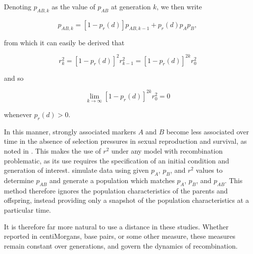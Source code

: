 \documentclass{article}
\begin{document}
Denoting $p_{AB,k}$ as the value of $p_{AB}$ at generation $k$, we then write

$$p_{AB,k} = [1 - p_r(d)] p_{AB,k-1} + p_r(d) p_A p_B,$$

\noindent from which it can easily be derived that

$$r^2_k = \left [ 1 - p_r(d) \right ]^2 r^2_{k-1} =  \left [ 1 - p_r(d) \right ]^{2k} r^2_0$$

\noindent and so

$$\lim_{k \rightarrow \infty} \left [ 1 - p_r(d) \right ]^{2k} r^2_0 = 0$$

\noindent whenever $p_r(d) > 0$.

In this manner, strongly associated markers $A$ and $B$ become less associated over time in the absence of selection pressures in sexual reproduction and survival, as noted in \cite{siegmundyakir2007}. This makes the use of $r^2$ under any model with recombination problematic, as its use requires the specification of an initial condition and generation of interest. \cite{LiJi2005} simulate data using given $p_A$, $p_B$, and $r^2$ values to determine $p_{AB}$ and generate a population which matches $p_A$, $p_B$, and $p_{AB}$. This method therefore ignores the population characteristics of the parents and offspring, instead providing only a snapshot of the population characteristics at a particular time.

It is therefore far more natural to use a distance in these studies. Whether reported in centiMorgans, base pairs, or some other measure, these measures remain constant over generations, and govern the dynamics of recombination.


\renewcommand*{\bibname}{References} %

\end{document}
